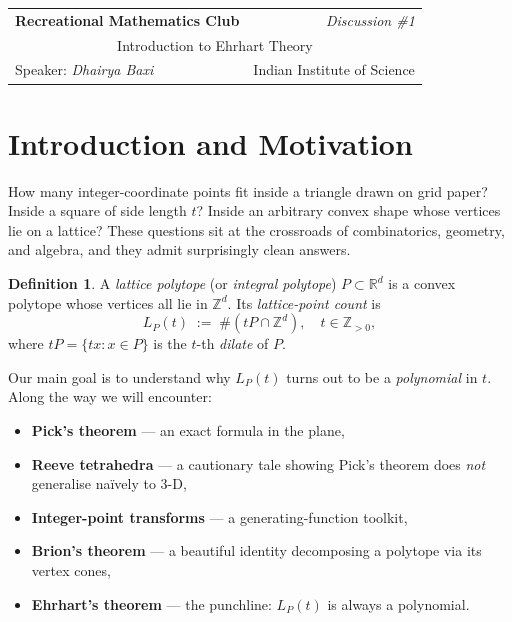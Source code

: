 \documentclass[11pt]{article}
\theoremstyle{plain}
\theoremstyle{definition}
\newtheorem{definition}[theorem]{Definition}
\newcommand{\Z}{\mathbb{Z}}
\newcommand{\R}{\mathbb{R}}
\begin{document}
\noindent
\begin{tabular}{|p{} r|}
\hline
\textbf{Recreational Mathematics Club} & \textit{Discussion \#1} \\[4pt]
\multicolumn{2}{|c|}{\Large Introduction to Ehrhart Theory} \\[4pt]
Speaker: \textit{Dhairya Baxi} & Indian Institute of Science \\
\hline
\end{tabular}


\section{Introduction and Motivation}

How many integer-coordinate points fit inside a triangle drawn on grid paper?
Inside a square of side length $t$?
Inside an arbitrary convex shape whose vertices lie on a lattice?
These questions sit at the crossroads of combinatorics, geometry, and algebra,
and they admit surprisingly clean answers.

\begin{definition}
  A \emph{lattice polytope} (or \emph{integral polytope}) $P \subset \R^d$ is a
  convex polytope whose vertices all lie in $\Z^d$.
  Its \emph{lattice-point count} is
  \[
    L_P(t) \;:=\; \#\!\left(tP \cap \Z^d\right),
      \quad t \in \Z_{>0},
  \]
  where $tP = \{tx : x \in P\}$ is the $t$-th \emph{dilate} of $P$.
\end{definition}

Our main goal is to understand why $L_P(t)$ turns out to be a \emph{polynomial} in $t$.
Along the way we will encounter:
\begin{itemize}
  \item \textbf{Pick's theorem} — an exact formula in the plane,
  \item \textbf{Reeve tetrahedra} — a cautionary tale showing Pick's theorem
        does \emph{not} generalise naïvely to 3-D,
  \item \textbf{Integer-point transforms} — a generating-function toolkit,
  \item \textbf{Brion's theorem} — a beautiful identity decomposing a polytope
        via its vertex cones,
  \item \textbf{Ehrhart's theorem} — the punchline: $L_P(t)$ is always a
        polynomial.
\end{itemize}
\end{document}

